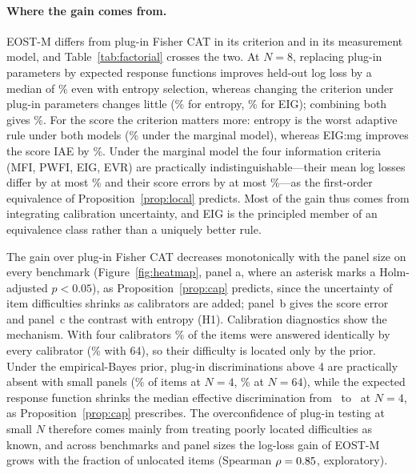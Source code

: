 \paragraph{Where the gain comes from.} EOST-M differs from plug-in Fisher CAT in its
criterion and in its measurement model, and Table~\ref{tab:factorial} crosses the two. At
$N=8$, replacing plug-in parameters by expected response functions improves held-out log
loss by a median of \FactEntMgLL\% even with entropy selection, whereas changing the
criterion under plug-in parameters changes little (\FactEntPiLL\% for entropy,
\FactEigPiLL\% for EIG); combining both gives \FactEigMgLL\%. For the score the criterion
matters more: entropy is the worst adaptive rule under both models (\FactEntMgIAE\% under
the marginal model), whereas EIG:mg improves the score IAE by \FactEigMgIAE\%. Under the
marginal model the four information criteria (MFI, PWFI, EIG, EVR) are practically
indistinguishable---their mean log losses differ by at most \InfoSpreadLL\% and their score
errors by at most \InfoSpreadIAE\%---as the first-order equivalence of
Proposition~\ref{prop:local} predicts. Most of the gain thus comes from integrating
calibration uncertainty, and EIG is the principled member of an equivalence class rather
than a uniquely better rule.



The gain over plug-in Fisher CAT decreases monotonically with the panel size on every
benchmark (Figure~\ref{fig:heatmap}, panel a, where an asterisk marks a Holm-adjusted
$p<0.05$), as Proposition~\ref{prop:cap} predicts, since the uncertainty of item difficulties
shrinks as calibrators are added; panel~b gives the score error and panel~c the contrast with
entropy (H1). Calibration diagnostics show the mechanism. With four calibrators
\FracExtremeNfour\% of the items were answered identically by every calibrator
(\FracExtremeNsixtyfour\% with 64), so their difficulty is located only by the prior. Under
the empirical-Bayes prior, plug-in discriminations above 4 are practically absent with small
panels (\FracAgtFourNfour\% of items at $N=4$, \FracAgtFourNsixtyfour\% at $N=64$), while the
expected response function shrinks the median effective discrimination from \AmapNfour\ to
\AeffNfour\ at $N=4$, as Proposition~\ref{prop:cap} prescribes. The
overconfidence of plug-in testing at small $N$ therefore comes mainly from treating poorly
located difficulties as known, and across benchmarks and panel sizes the log-loss gain of
EOST-M grows with the fraction of unlocated items (Spearman $\rho=0.85$, exploratory).

